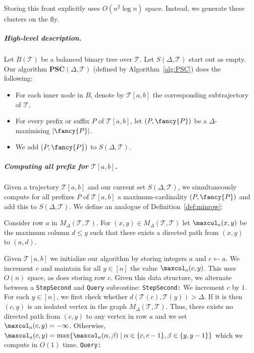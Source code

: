 Storing this front explicitly uses $O(n^2 \log n)$ space. Instead, we generate these clusters on the fly.  
%
\subparagraph{High-level description.}
Let $B(\mathcal{T})$ be a balanced binary tree over $\mathcal{T}$.
Let $S(\Delta, \mathcal{T})$ start out as empty. Our algorithm \textbf{PSC}$(\Delta, \mathcal{T})$  (defined by Algorithm~\ref{alg:PSC}) does the following: 
%
%
\begin{itemize}
    \item For each inner node in $B$, denote by  $\mathcal{T}[a, b]$ the corresponding subtrajectory of $\mathcal{T}$.
    \item For every prefix or suffix $P$ of $\mathcal{T}[a, b]$, let  $(P, {\fancy{P}})$ be a $\Delta$-\pathlet  maximising $|{\fancy{P}}|$.  
    \item We add $(P, {\fancy{P}})$ to $S(\Delta, \mathcal{T})$.
\end{itemize}
%
%
\subparagraph{Computing all prefix \pathlets for $\mathcal{T}[a, b]$.}
Given a trajectory $\mathcal{T}[a, b]$ and our current set $S(\Delta, \mathcal{T})$, we simultaneously compute for all prefixes $P$ of $\mathcal{T}[a, b]$ a maximum-cardinality \pathlet $(P, {\fancy{P}})$ and add this \pathlet to $S(\Delta, \mathcal{T})$.
We define an analogue of Definition~\ref{def:minrow}: 
%
%
\begin{definition}
Consider row $a$ in $M_\Delta(\mathcal{T}, \mathcal{T})$. 
    For $(x, y) \in M_\Delta(\mathcal{T}, \mathcal{T})$ let $\maxcol_a(x, y)$ be the maximum column $d \leq y$ such that there exists a directed path from $(x, y)$ to $(a, d)$.
\end{definition}
%
%
\noindent
Given $\mathcal{T}[a,b]$ we initialize our algorithm by storing integers $a$ and $c \gets a$. 
We increment $c$ and maintain for all $y \in [n]$ the value $\maxcol_a(c, y)$. This uses $O(n)$ space, as does storing row $c$. 
Given this data structure, we alternate between a \texttt{StepSecond} and \texttt{Query} subroutine:
%
  \vspace{0.5cm}
\texttt{StepSecond:} We increment $c$ by $1$. 
For each $y \in [n]$, we first check whether $d(\mathcal{T}(c), \mathcal{T}(y)) > \Delta$.
If it is then $(c, y)$ is an isolated vertex in the graph $M_\Delta(\mathcal{T}, \mathcal{T})$. Thus, there exists no directed path from $(c, y)$ to any vertex in row $a$ and we set $\maxcol_a(c, y) = - \infty$. 
Otherwise, $\maxcol_a(c, y) = \max \{ \maxcol_a(\alpha, \beta) \mid  \alpha \in \{ c, c - 1 \}, \beta \in \{ y, y - 1 \}   \}$ which we compute in $O(1)$ time. 
%
\texttt{Query:}
